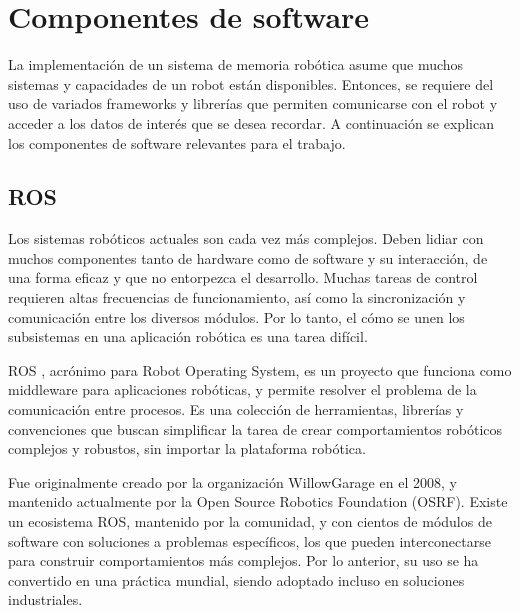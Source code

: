 
\section{Componentes de software}

La implementación de un sistema de memoria robótica asume que muchos sistemas y capacidades de un robot están disponibles. Entonces, se requiere del uso de variados frameworks y librerías que permiten comunicarse con el robot y acceder a los datos de interés que se desea recordar. A continuación se explican los componentes de software relevantes para el trabajo.

\subsection{ROS}

Los sistemas robóticos actuales son cada vez más complejos. Deben lidiar con muchos componentes tanto de hardware como de software y su interacción, de una forma eficaz y que no entorpezca el desarrollo. Muchas tareas de control requieren altas frecuencias de funcionamiento, así como la sincronización y comunicación entre los diversos módulos. Por lo tanto, el cómo se unen los subsistemas en una aplicación robótica es una tarea difícil.

ROS \cite{ROS:2009}, acrónimo para Robot Operating System, es un proyecto que funciona como middleware para aplicaciones robóticas, y permite resolver el problema de la comunicación entre procesos. Es una colección de herramientas, librerías y convenciones que buscan simplificar la tarea de crear comportamientos robóticos complejos y robustos, sin importar la plataforma robótica.

Fue originalmente creado por la organización WillowGarage en el 2008, y mantenido actualmente por la Open Source Robotics Foundation (OSRF). Existe un ecosistema ROS, mantenido por la comunidad, y con cientos de módulos de software con soluciones a problemas específicos, los que pueden interconectarse para construir comportamientos más complejos. Por lo anterior, su uso se ha convertido en una práctica mundial, siendo adoptado incluso en soluciones industriales.


